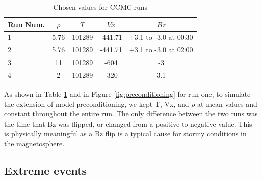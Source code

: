 \begin{table}
\begin{center}
  \caption{Chosen values for CCMC runs}
  \begin{tabular}{| l | c | c | c | c | }
    \hline
    \textbf{Run Num.} & \textbf{$\rho$} & \textbf{$T$} & \textbf{$Vx$} &
    \textbf{$Bz$}
    \\
    \hline 
    1 & 5.76 & 101289 & -441.71  & +3.1 to -3.0 at 00:30 \\ \hline
    2 & 5.76 & 101289 & -441.71  & +3.1 to -3.0 at 02:00 \\ \hline
    3 & 11 & 101289 & -604 & -3 \\ \hline
    4 & 2 & 101289 & -320 & 3.1 \\ \hline
  \end{tabular}
  \label{table:runs}
\end{center}
\end{table}

As shown in Table \ref{table:runs} and in Figure \ref{fig:preconditioning} for
run one, to simulate the extension of model preconditioning, we kept T, Vx, and
$\rho$ at mean values and constant throughout the entire run. The only
difference between the two runs was the time that Bz was flipped, or changed
from a positive to negative value. This is physically meaningful as a Bz flip is
a typical cause for stormy conditions in the magnetosphere.

\subsection{Extreme events}

